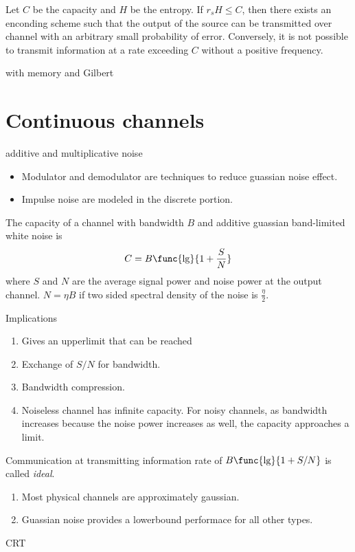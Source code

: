 \begin{theorem}
    Let \(C\) be the capacity and \(H\) be the entropy. If \(r_sH \leq C\), then there exists an enconding scheme such that the output of the source can be transmitted over channel with an arbitrary small probability of error. Conversely, it is not possible to transmit information at a rate exceeding \(C\) without a positive frequency.
\end{theorem}

\begin{remark}
    with memory and Gilbert
\end{remark}

\section{Continuous channels}
\begin{remark}
    additive and multiplicative noise
\end{remark}

\begin{itemize}
    \item Modulator and demodulator are techniques to reduce guassian noise effect.
    \item Impulse noise are modeled in the discrete portion.
\end{itemize}

\begin{theorem}
    The capacity of a channel with bandwidth \(B\) and additive guassian band-limited white noise is 
    \begin{equation*}
        C = B \func{\lg}{1 + \dfrac{S}{N}}
    \end{equation*}
    where \(S\) and \(N\) are the average signal power and noise power at the output channel. \(N = \eta B\) if two sided spectral density of the noise is \(\frac{\eta}{2}\). 
\end{theorem}

Implications 
\begin{enumerate}
    \item Gives an upperlimit that can be reached
    \item Exchange of \(S/N\) for bandwidth.
    \item Bandwidth compression.
    \item Noiseless channel has infinite capacity. For noisy channels, as bandwidth increases because the noise power increases as well, the capacity approaches a limit.
\end{enumerate}

Communication at transmitting information rate of \(B \func{\lg}{1 + S/N}\) is called \textit{ideal}.
\begin{enumerate}
    \item Most physical channels are approximately gaussian.
    \item Guassian noise provides a lowerbound performace for all other types.
\end{enumerate}
\begin{remark}
    CRT
\end{remark}